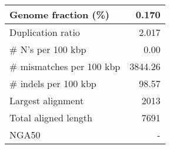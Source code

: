 \documentclass[12pt,a4paper]{article}
\begin{document}
\begin{table}[ht]
\begin{center}
\begin{tabular}{|l*{1}{|r}|}
Genome fraction (\%) & 0.170 \\ \hline
Duplication ratio & 2.017 \\ \hline
\# N's per 100 kbp & 0.00 \\ \hline
\# mismatches per 100 kbp & 3844.26 \\ \hline
\# indels per 100 kbp & 98.57 \\ \hline
Largest alignment & 2013 \\ \hline
Total aligned length & 7691 \\ \hline
NGA50 & - \\ \hline
\end{tabular}
\end{center}
\end{table}
\end{document}
